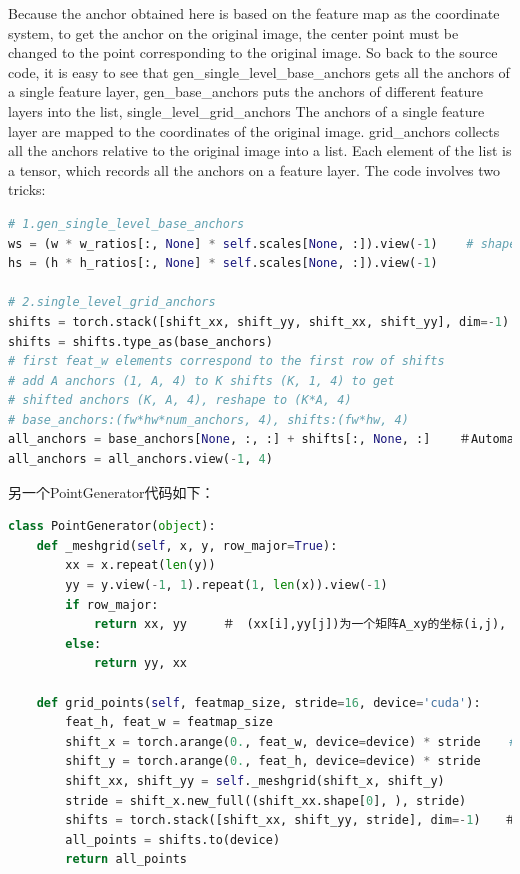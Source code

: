 \documentclass[UTF8]{ctexart}
\begin{document}
Because the anchor obtained here is based on the feature map as the coordinate system, to get 
the anchor on the original image, the center point must be changed to the point corresponding 
to the original image. So back to the source code, it is easy to see that 
gen\_single\_level\_base\_anchors gets all the anchors of a single feature layer, 
gen\_base\_anchors puts the anchors of different feature layers into the list, 
single\_level\_grid\_anchors The anchors of a single feature layer are mapped to the coordinates 
of the original image. grid\_anchors collects all the anchors relative to the original image into a list. 
Each element of the list is a tensor, which records all the anchors on a feature layer. The code involves 
two tricks:
\lstset{style=mystyle}
\begin{lstlisting}[language=Python]
# 1.gen_single_level_base_anchors
ws = (w * w_ratios[:, None] * self.scales[None, :]).view(-1)    # shape: (len(ratios), len(scales))
hs = (h * h_ratios[:, None] * self.scales[None, :]).view(-1)

# 2.single_level_grid_anchors
shifts = torch.stack([shift_xx, shift_yy, shift_xx, shift_yy], dim=-1)
shifts = shifts.type_as(base_anchors)
# first feat_w elements correspond to the first row of shifts
# add A anchors (1, A, 4) to K shifts (K, 1, 4) to get
# shifted anchors (K, A, 4), reshape to (K*A, 4)
# base_anchors:(fw*hw*num_anchors, 4), shifts:(fw*hw, 4)
all_anchors = base_anchors[None, :, :] + shifts[:, None, :]    ＃Automatic tensor expansion
all_anchors = all_anchors.view(-1, 4)
\end{lstlisting}


另一个PointGenerator代码如下：
\lstset{style=mystyle}
\begin{lstlisting}[language=Python]
class PointGenerator(object):
	def _meshgrid(self, x, y, row_major=True):
		xx = x.repeat(len(y))
		yy = y.view(-1, 1).repeat(1, len(x)).view(-1)
		if row_major:
			return xx, yy　　　＃　(xx[i],yy[j])为一个矩阵A_xy的坐标(i,j), dim(xx)=1时
		else:
			return yy, xx

	def grid_points(self, featmap_size, stride=16, device='cuda'):
		feat_h, feat_w = featmap_size
		shift_x = torch.arange(0., feat_w, device=device) * stride    # 特征网格对应到原图网格
		shift_y = torch.arange(0., feat_h, device=device) * stride
		shift_xx, shift_yy = self._meshgrid(shift_x, shift_y)
		stride = shift_x.new_full((shift_xx.shape[0], ), stride)
		shifts = torch.stack([shift_xx, shift_yy, stride], dim=-1)　　＃ x, y和对应点的stride大小
		all_points = shifts.to(device)
		return all_points
\end{lstlisting}
\end{document}
